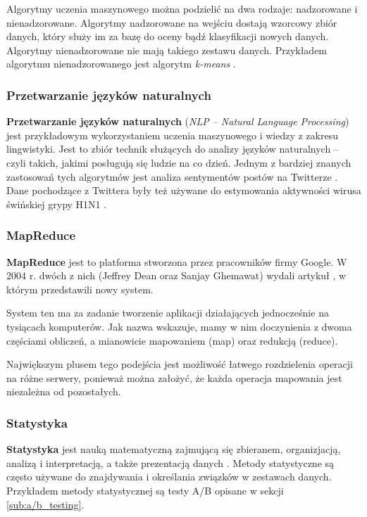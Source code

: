 Algorytmy uczenia maszynowego można podzielić na dwa rodzaje: nadzorowane i nienadzorowane. Algorytmy nadzorowane na wejściu dostają wzorcowy zbiór danych, który służy im za bazę do oceny bądź klasyfikacji nowych danych. Algorytmy nienadzorowane nie mają takiego zestawu danych. Przykładem algorytmu nienadzorowanego jest algorytm \textit{k-means} \cite{sugar03}.

\subsubsection{Przetwarzanie języków naturalnych}
\label{sub:nlp}
\textbf{Przetwarzanie języków naturalnych} (\textit{NLP -- Natural Language Processing}) jest przykładowym wykorzystaniem uczenia maszynowego i wiedzy z zakresu lingwistyki. Jest to zbiór technik służących do analizy języków naturalnych -- czyli takich, jakimi posługują się ludzie na co dzień. Jednym z bardziej znanych zastosowań tych algorytmów jest analiza sentymentów postów na Twitterze \cite{agarwal11}. Dane pochodzące z Twittera były też używane do estymowania aktywności wirusa świńskiej grypy H1N1 \cite{signorini11}.

\subsubsection{MapReduce}
\label{sub:mapreduce}
\textbf{MapReduce} jest to platforma stworzona przez pracowników firmy Google.  W 2004 r. dwóch z nich (Jeffrey Dean oraz Sanjay Ghemawat) wydali artykuł \cite{dean08}, w którym przedstawili nowy system. 

System ten ma za zadanie tworzenie aplikacji działających jednocześnie na tysiącach komputerów. Jak nazwa wskazuje, mamy w nim doczynienia z dwoma częściami obliczeń, a mianowicie mapowaniem (map) oraz redukcją (reduce).

Największym plusem tego podejścia jest możliwość łatwego rozdzielenia operacji na różne serwery, ponieważ można założyć, że każda operacja mapowania jest niezależna od pozostałych.

\subsubsection{Statystyka}
\label{sub:statystyka}
\textbf{Statystyka} jest nauką matematyczną zajmującą się zbieranem, organizjacją, analizą i interpretacją, a także prezentacją danych \cite{statystyka:podrecznik}. Metody statystyczne są często używane do znajdywania i określania związków w zestawach danych. Przykładem metody statystycznej są testy A/B opisane w sekcji \ref{sub:a/b_testing}.

